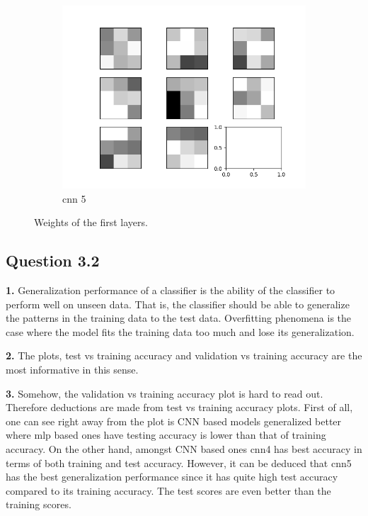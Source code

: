 \documentclass{assignment}
\begin{document}
\begin{figure}[htbp!]
\begin{subfigure}{0.3\textwidth}
        \includegraphics[width=\textwidth]{figures/weights_cnn_5.png}
        \caption{cnn 5}
    \end{subfigure}\hfill
    \caption{Weights of the first layers.}
    \label{fig:weights}
\end{figure}

\subsection{Question 3.2}

\textbf{1.}
Generalization performance of a classifier is the ability of the classifier to perform well on unseen data. That is, the classifier should be able to generalize the patterns in the training data to the test data. Overfitting phenomena is the case where the model fits the training data too much and lose its generalization.

\textbf{2.}
The plots, test vs training accuracy and validation vs training accuracy are the most informative in this sense.


\textbf{3.}
Somehow, the validation vs training accuracy plot is hard to read out. Therefore deductions are made from test vs training accuracy plots. First of all, one can see right away from the plot is CNN based models generalized  better where mlp based ones have testing accuracy is lower than that of training accuracy. On the other hand, amongst CNN based ones cnn4 has best accuracy in terms of both training and test accuracy. However, it can be deduced that cnn5 has the best generalization performance since it has quite high test accuracy compared to its training accuracy. The test scores are even better than the training scores. 
\end{document}

